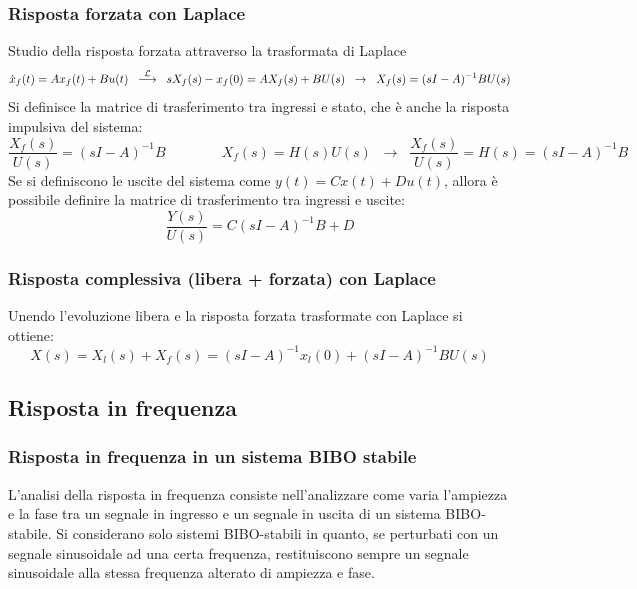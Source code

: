 \subsubsection*{Risposta forzata con Laplace}
Studio della risposta forzata attraverso la trasformata di Laplace
\[\dot{x}_f(t) = Ax_f(t) + Bu(t) \;\;\stackrel{\mathcal{L}}{\longrightarrow}\;\; sX_f(s) - x_f(0) = AX_f(s) + BU(s) \;\;\rightarrow\;\; X_f(s) = (sI-A)^{-1}BU(s)\]
Si definisce la matrice di trasferimento tra ingressi e stato, che è anche la risposta impulsiva del sistema:
\[\frac{X_f(s)}{U(s)} = (sI-A)^{-1}B \qquad\qquad X_f(s) = H(s)U(s) \;\;\rightarrow\;\; \frac{X_f(s)}{U(s)} = H(s) = (sI-A)^{-1}B\]
Se si definiscono le uscite del sistema come \(y(t) = Cx(t) + Du(t)\), allora è possibile definire la matrice di trasferimento tra 
ingressi e uscite: \[\frac{Y(s)}{U(s)} = C(sI-A)^{-1}B + D\]

\subsubsection*{Risposta complessiva (libera + forzata) con Laplace}
Unendo l'evoluzione libera e la risposta forzata trasformate con Laplace si ottiene:
\[X(s) = X_l(s) + X_f(s) = (sI-A)^{-1} x_l(0) + (sI-A)^{-1}BU(s)\]

\subsection{Risposta in frequenza}
\subsubsection*{Risposta in frequenza in un sistema BIBO stabile}
L'analisi della risposta in frequenza consiste nell'analizzare come varia l'ampiezza e la fase tra un segnale in ingresso e un segnale
in uscita di un sistema BIBO-stabile. Si considerano solo sistemi BIBO-stabili in quanto, se perturbati con un segnale sinusoidale ad
una certa frequenza, restituiscono sempre un segnale sinusoidale alla stessa frequenza alterato di ampiezza e fase.

